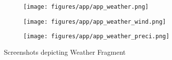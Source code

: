 \begin{figure}[!ht]
    \centering

    \begin{subfigure}{0.25\textwidth}
        \centering
        \texttt{[image: figures/app/app\_weather.png]}
    \end{subfigure}
    \begin{subfigure}{0.25\textwidth}
        \centering
        \texttt{[image: figures/app/app\_weather\_wind.png]}
        
        \vspace{\baselineskip}
        \vspace{\baselineskip}

        \texttt{[image: figures/app/app\_weather\_preci.png]}
    \end{subfigure}


    
    \caption{Screenshots depicting Weather Fragment}
    \label{fig:app_maps}
\end{figure}